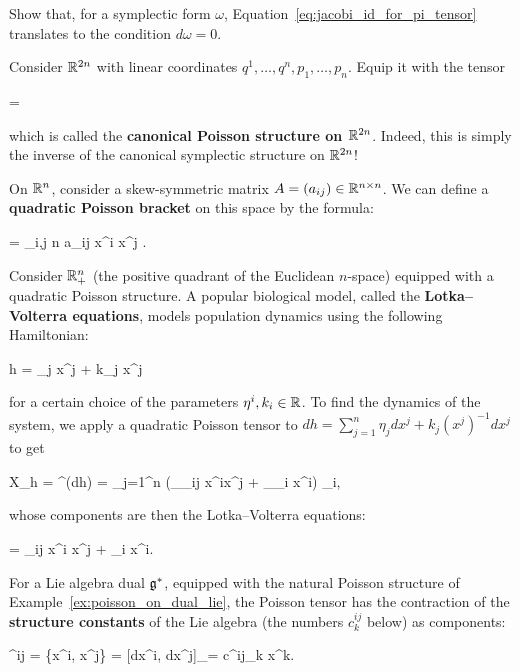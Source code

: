 \begin{exercise}
	Show that, for a symplectic form $\omega$, Equation~\eqref{eq:jacobi_id_for_pi_tensor} translates to the condition $d\omega = 0$.
\end{exercise}
\begin{example}
\label{ex:canonical_poisson}
	Consider $\mathbb{R}^{2n}$ with linear coordinates $q^1, \ldots, q^n, p_1, \ldots, p_n$. Equip it with the tensor
	\begin{eqalign}
		\Pi =  \wedge {}
	\end{eqalign}
	which is called the \textbf{canonical Poisson structure on $\mathbb{R}^{2n}$}. Indeed, this is simply the inverse of the canonical symplectic structure on $\mathbb{R}^{2n}$!
\end{example}
\begin{example}
\label{ex:quadratic_poisson}
	On $\mathbb{R}^n$, consider a skew-symmetric matrix $A = (a_{ij}) \in \mathbb{R}^{n \times n}$. We can define a \textbf{quadratic Poisson bracket} on this space by the formula:
	\begin{eqalign}
		\Pi =  \sum_{i,j \leq n} a_{ij} x^i x^j  \wedge \pder{}{x_j}.
	\end{eqalign}
\end{example}
\begin{example}
	Consider $\mathbb{R}^n_+$ (the positive quadrant of the Euclidean $n$-space) equipped with a quadratic Poisson structure. A popular biological model, called the \textbf{Lotka--Volterra equations}, models population dynamics using the following Hamiltonian:
	\begin{eqalign}
		h = \eta_j x^j + k_j \log x^j
	\end{eqalign}
	for a certain choice of the parameters $\eta^i, k_i \in \mathbb{R}$. To find the dynamics of the system, we apply a quadratic Poisson tensor to $dh = \sum_{j=1}^n \eta_j dx^j + k_j (x^j)^{-1} dx^j$ to get
	\begin{eqalign}
		X_h = \Pi^\sharp(dh) = \sum_{j=1}^n (_{\gamma_{ij}} x^ix^j + _{\varepsilon_i} x^i) \partial_i,
	\end{eqalign}
	whose components are then the Lotka--Volterra equations:
	\begin{eqalign}
		 = \gamma_{ij} x^i x^j + \varepsilon_i x^i.
	\end{eqalign}
\end{example}
\begin{example}
	For a Lie algebra dual $\mathfrak g^*$, equipped with the natural Poisson structure of Example~\ref{ex:poisson_on_dual_lie}, the Poisson tensor has the contraction of the \textbf{structure constants} of the Lie algebra (the numbers $c^{ij}_k$ below) as components:
	\begin{eqalign}
		\Pi^{ij} = \{x^i, x^j\} = [dx^i, dx^j]_\lalg = c^{ij}_k x^k.
	\end{eqalign}
\end{example}

